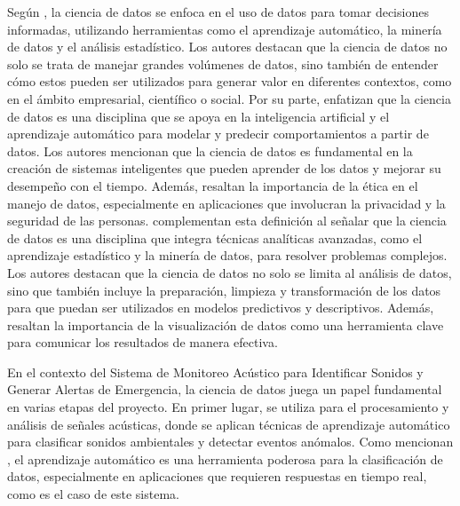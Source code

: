 
Según \citeauthor{provost_data_2013} \citeyear{provost_data_2013}, la ciencia de datos se enfoca en el uso de datos para tomar decisiones informadas, utilizando herramientas como el aprendizaje automático, la minería de datos y el análisis estadístico. Los autores destacan que la ciencia de datos no solo se trata de manejar grandes volúmenes de datos, sino también de entender cómo estos pueden ser utilizados para generar valor en diferentes contextos, como en el ámbito empresarial, científico o social. Por su parte, \citeauthor{russell_artificial_2022} \citeyear{russell_artificial_2022} enfatizan que la ciencia de datos es una disciplina que se apoya en la inteligencia artificial y el aprendizaje automático para modelar y predecir comportamientos a partir de datos. Los autores mencionan que la ciencia de datos es fundamental en la creación de sistemas inteligentes que pueden aprender de los datos y mejorar su desempeño con el tiempo. Además, resaltan la importancia de la ética en el manejo de datos, especialmente en aplicaciones que involucran la privacidad y la seguridad de las personas. \citeauthor{garcia_ciencia_2018} \citeyear{garcia_ciencia_2018} complementan esta definición al señalar que la ciencia de datos es una disciplina que integra técnicas analíticas avanzadas, como el aprendizaje estadístico y la minería de datos, para resolver problemas complejos. Los autores destacan que la ciencia de datos no solo se limita al análisis de datos, sino que también incluye la preparación, limpieza y transformación de los datos para que puedan ser utilizados en modelos predictivos y descriptivos. Además, resaltan la importancia de la visualización de datos como una herramienta clave para comunicar los resultados de manera efectiva.

En el contexto del Sistema de Monitoreo Acústico para Identificar Sonidos y Generar Alertas de Emergencia, la ciencia de datos juega un papel fundamental en varias etapas del proyecto. En primer lugar, se utiliza para el procesamiento y análisis de señales acústicas, donde se aplican técnicas de aprendizaje automático para clasificar sonidos ambientales y detectar eventos anómalos. Como mencionan \citeauthor{provost_data_2013} \citeyear{provost_data_2013}, el aprendizaje automático es una herramienta poderosa para la clasificación de datos, especialmente en aplicaciones que requieren respuestas en tiempo real, como es el caso de este sistema.

